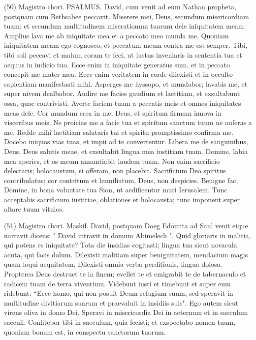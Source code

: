 \begin{biblechapter}  (50) 
\verse  Magistro chori. PSALMUS. David, 
\verse cum venit ad eum Nathan propheta, postquam cum Bethsabee peccavit. 
\verse Miserere mei, Deus, secundum misericordiam tuam; et secundum multitudinem miserationum tuarum dele iniquitatem meam. 
\verse Amplius lava me ab iniquitate mea et a peccato meo munda me. 
\verse Quoniam iniquitatem meam ego cognosco, et peccatum meum contra me est semper. 
\verse Tibi, tibi soli peccavi et malum coram te feci, ut iustus inveniaris in sententia tua et aequus in iudicio tuo. 
\verse Ecce enim in iniquitate generatus sum, et in peccato concepit me mater mea. 
\verse Ecce enim veritatem in corde dilexisti et in occulto sapientiam manifestasti mihi. 
\verse Asperges me hyssopo, et mundabor; lavabis me, et super nivem dealbabor. 
\verse Audire me facies gaudium et laetitiam, et exsultabunt ossa, quae contrivisti. 
\verse Averte faciem tuam a peccatis meis et omnes iniquitates meas dele. 
\verse Cor mundum crea in me, Deus, et spiritum firmum innova in visceribus meis. 
\verse Ne proicias me a facie tua et spiritum sanctum tuum ne auferas a me. 
\verse Redde mihi laetitiam salutaris tui et spiritu promptissimo confirma me. 
\verse Docebo iniquos vias tuas, et impii ad te convertentur. 
\verse Libera me de sanguinibus, Deus, Deus salutis meae, et exsultabit lingua mea iustitiam tuam. 
\verse Domine, labia mea aperies, et os meum annuntiabit laudem tuam. 
\verse Non enim sacrificio delectaris; holocaustum, si offeram, non placebit. 
\verse Sacrificium Deo spiritus contribulatus; cor contritum et humiliatum, Deus, non despicies. 
\verse Benigne fac, Domine, in bona voluntate tua Sion, ut aedificentur muri Ierusalem. 
\verse Tunc acceptabis sacrificium iustitiae, oblationes et holocausta; tunc imponent super altare tuum vitulos. 
\end{biblechapter}

\begin{biblechapter}  (51) 
\verse  Magistro chori. Maskil. David, 
\verse postquam Doeg Edomita ad Saul venit eique narravit dicens: " David intravit in domum Abimelech ". 
\verse Quid gloriaris in malitia, qui potens es iniquitate? 
\verse Tota die insidias cogitasti; lingua tua sicut novacula acuta, qui facis dolum. 
\verse Dilexisti malitiam super benignitatem, mendacium magis quam loqui aequitatem. 
\verse Dilexisti omnia verba perditionis, lingua dolosa. 
\verse Propterea Deus destruet te in finem; evellet te et emigrabit te de tabernaculo et radicem tuam de terra viventium. 
\verse Videbunt iusti et timebunt et super eum ridebunt: 
\verse “Ecce homo, qui non posuit Deum refugium suum, sed speravit in multitudine divitiarum suarum et praevaluit in insidiis suis". 
\verse Ego autem sicut virens oliva in domo Dei. Speravi in misericordia Dei in aeternum et in saeculum saeculi. 
\verse Confitebor tibi in saeculum, quia fecisti; et exspectabo nomen tuum, quoniam bonum est, in conspectu sanctorum tuorum. 
\end{biblechapter}

